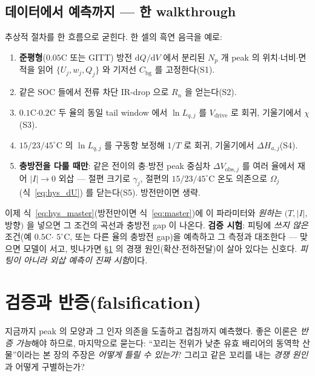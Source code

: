 \documentclass[11pt,a4paper]{article}
\newcommand{\dd}{\mathrm{d}}
\newcommand{\drive}{\mathrm{drive}}
\newcommand{\bg}{\mathrm{bg}}
\begin{document}
\subsection{데이터에서 예측까지 — 한 walkthrough}
추상적 절차를 한 흐름으로 굳힌다. 한 셀의 흑연 음극을 예로:
\begin{enumerate}[label=\textbf{\arabic*.},leftmargin=2.0em,itemsep=1pt]
\item \textbf{준평형}($0.05$C 또는 GITT) 방전 $\dd Q/\dd V$ 에서 분리된 $N_p$ 개 peak 의 위치$\cdot$너비$\cdot$면적을
  읽어 $\{U_j,w_j,Q_j\}$ 와 기저선 $C_\bg$ 를 고정한다(S1).
\item 같은 SOC 들에서 전류 차단 IR-drop 으로 $R_n$ 을 얻는다(S2).
\item $0.1$C$\cdot$$0.2$C 두 율의 동일 tail window 에서 $\ln L_{q,j}$ 를 $V_\drive$ 로 회귀, 기울기에서 $\chi$(S3).
\item $15/23/45^\circ$C 의 $\ln L_{q,j}$ 를 구동항 보정해 $1/T$ 로 회귀, 기울기에서 $\Delta H_{a,j}$(S4).
\item \textbf{충방전을 다룰 때만}: 같은 전이의 충$\cdot$방전 peak 중심차 $\Delta V_{\mathrm{obs},j}$ 를 여러 율에서 재어
  $|I|\to0$ 외삽 — 절편 크기로 $\gamma_j$, 절편의 $15/23/45^\circ$C 온도 의존으로 $\Omega_j$(식~\eqref{eq:hys_dU})
  를 닫는다(S5). 방전만이면 생략.
\end{enumerate}
이제 식~\eqref{eq:hys_master}(방전만이면 식~\eqref{eq:master})에 이 파라미터와 \emph{원하는} $(T,|I|,$ 방향$)$ 을
넣으면 그 조건의 곡선과 충방전 gap 이 나온다. \textbf{검증 시험}: 피팅에 \emph{쓰지 않은} 조건(예 $0.5$C$\cdot$
$5^\circ$C, 또는 다른 율의 충방전 gap)을 예측하고 그 측정과 대조한다 — 맞으면 모델이 서고, 빗나가면
\S\ref{sec:falsify} 의 경쟁 원인(확산$\cdot$전하전달)이 살아 있다는 신호다. \emph{피팅이 아니라 외삽 예측이 진짜 시험}이다.

\section{검증과 반증(falsification)}\label{sec:falsify}
지금까지 peak 의 모양과 그 인자 의존을 도출하고 겹침까지 예측했다. 좋은 이론은 \emph{반증 가능}해야 하므로,
마지막으로 묻는다: ``꼬리는 전위가 낮춘 유효 배리어의 동역학 산물''이라는 본 장의 주장은 \emph{어떻게 틀릴 수
있는가}? 그리고 같은 꼬리를 내는 \emph{경쟁 원인}과 어떻게 구별하는가?
\end{document}
